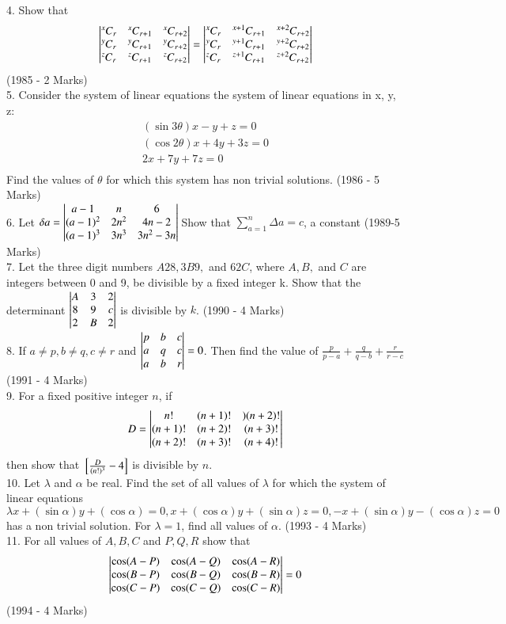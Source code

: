 \documentclass[journal,12pt,twocolumn]{IEEEtran}
\newcommand\Comb[2][^n]{\prescript{#1\mkern-0.5mu}{}C_{#2}}
\theoremstyle{remark}
\begin{document}
4. Show that $$\mydet{\Comb[x]{r}&\Comb[x]{r+1}&\Comb[x]{r+2}\\\Comb[y]{r}&\Comb[y]{r+1}&\Comb[y]{r+2}\\\Comb[z]{r}&\Comb[z]{r+1}&\Comb[z]{r+2}}=\mydet{\Comb[x]{r}&\Comb[x+1]{r+1}&\Comb[x+2]{r+2}\\\Comb[y]{r}&\Comb[y+1]{r+1}&\Comb[y+2]{r+2}\\\Comb[z]{r}&\Comb[z+1]{r+1}&\Comb[z+2]{r+2}}$$ \hfill (1985 - 2 Marks)\\[2pt]

5. Consider the system of linear equations the system of linear equations in x, y, z:\\\begin{align*}(\sin 3\theta) x-y+z=0\\(\cos 2\theta)x+4y+3z=0\\2x+7y+7z=0\\\end{align*} Find the values of $\theta$ for which this system has non trivial solutions. \hfill (1986 - 5 Marks)\\[2pt]

6. Let $\delta a=\begin{vmatrix}a-1&n&6\\(a-1)^2&2n^2&4n-2\\(a-1)^3&3n^3&3n^2-3n\end{vmatrix}\\$Show that $\displaystyle\sum_{a=1}^{n}\Delta a=c$, a constant \hfill (1989-5 Marks)\\[2pt]

7. Let the three digit numbers $A28, 3B9,$ and $62C$, where $A, B,$ and $C$ are integers between 0 and 9, be divisible by a fixed integer k. Show that the determinant $\begin{vmatrix}A&3&2\\8&9&c\\2&B&2\end{vmatrix}$ is divisible by $k$. \hfill (1990 - 4 Marks)\\[2pt]

8. If $a\neq p, b\neq q, c\neq r$ and $\begin{vmatrix}p&b&c\\a&q&c\\a&b&r\end{vmatrix}=0$. Then find the value of $\frac{p}{p-a}+\frac{q}{q-b}+\frac{r}{r-c}$ \hfill (1991 - 4 Marks)\\[2pt]

9. For a fixed positive integer $n$, if $$D=\begin{vmatrix}n!&(n+1)!&)(n+2)!\\(n+1)!&(n+2)!&(n+3)!\\(n+2)!&(n+3)!&(n+4)!\end{vmatrix}$$ then show that ${}\left[\frac{D}{(n!)^3}-4\right]$ is divisible by $n$.\\[2pt]

10. Let $\lambda$ and $\alpha$ be real. Find the set of all values of $\lambda$ for which the system of linear equations $$\lambda x+(\sin\alpha)y+(\cos\alpha)=0, x+(\cos\alpha)y+(\sin\alpha)z=0,-x+(\sin\alpha)y-(\cos\alpha)z=0$$ has a non trivial solution. For $\lambda = 1$, find all values of $\alpha$. \hfill (1993 - 4 Marks)\\[2pt]

11. For all values of $A,B,C$ and $P,Q,R$ show that $$\begin{vmatrix}\cos(A-P)&\cos(A-Q)&\cos(A-R)\\\cos(B-P)&\cos(B-Q)&\cos(B-R)\\\cos(C-P)&\cos(C-Q)&\cos(C-R)\end{vmatrix}=0$$ \hfill (1994 - 4 Marks)\\[2pt]
\end{document}
